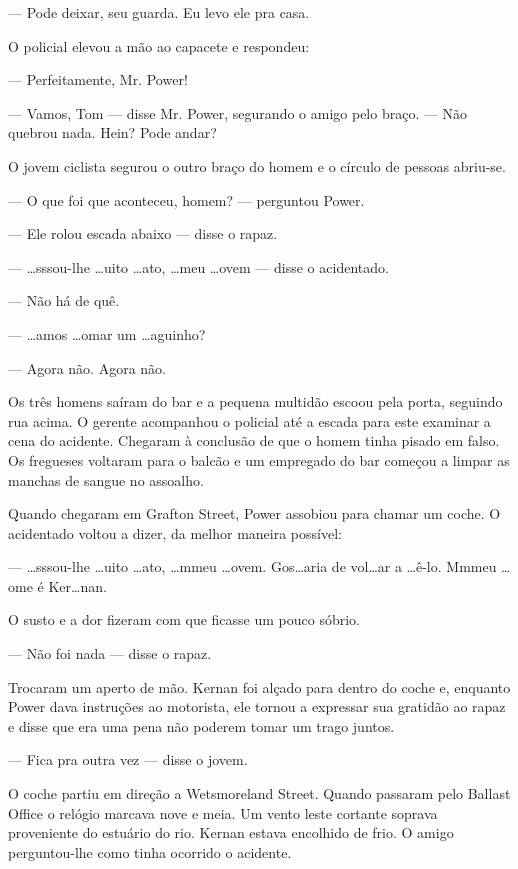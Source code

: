 --- Pode deixar, seu guarda. Eu levo ele pra casa.

O policial elevou a mão ao capacete e respondeu:

--- Perfeitamente, Mr. Power!

--- Vamos, Tom --- disse Mr. Power, segurando o amigo pelo braço. ---
Não quebrou nada. Hein? Pode andar?

O jovem ciclista segurou o outro braço do homem e o círculo de pessoas
abriu-se.

--- O que foi que aconteceu, homem? --- perguntou Power.

--- Ele rolou escada abaixo --- disse o rapaz.

--- \ldots{}sssou-lhe \ldots{}uito \ldots{}ato, \ldots{}meu \ldots{}ovem --- disse o
acidentado.

--- Não há de quê.

--- \ldots{}amos \ldots{}omar um \ldots{}aguinho?

--- Agora não. Agora não.

Os três homens saíram do bar e a pequena multidão escoou pela porta,
seguindo rua acima. O gerente acompanhou o policial até a escada para
este examinar a cena do acidente. Chegaram à conclusão de que o homem
tinha pisado em falso. Os fregueses voltaram para o balcão e um
empregado do bar começou a limpar as manchas de sangue no assoalho.

Quando chegaram em Grafton Street, Power assobiou para chamar um
coche. O acidentado voltou a dizer, da melhor maneira possível:

--- \ldots{}sssou-lhe \ldots{}uito \ldots{}ato, \ldots{}mmeu \ldots{}ovem. Gos\ldots{}aria de
vol\ldots{}ar a \ldots{}ê-lo. Mmmeu \ldots{}ome é Ker\ldots{}nan.

O susto e a dor fizeram com que ficasse um pouco sóbrio.

--- Não foi nada --- disse o rapaz.

Trocaram um aperto de mão. Kernan foi alçado para dentro do coche e,
enquanto Power dava instruções ao motorista, ele tornou a expressar
sua gratidão ao rapaz e disse que era uma pena não poderem tomar um
trago juntos.

--- Fica pra outra vez --- disse o jovem.

O coche partiu em direção a Wetsmoreland Street. Quando passaram pelo
Ballast Office o relógio marcava nove e meia. Um vento leste cortante
soprava proveniente do estuário do rio. Kernan estava encolhido de
frio. O amigo perguntou-lhe como tinha ocorrido o acidente.

